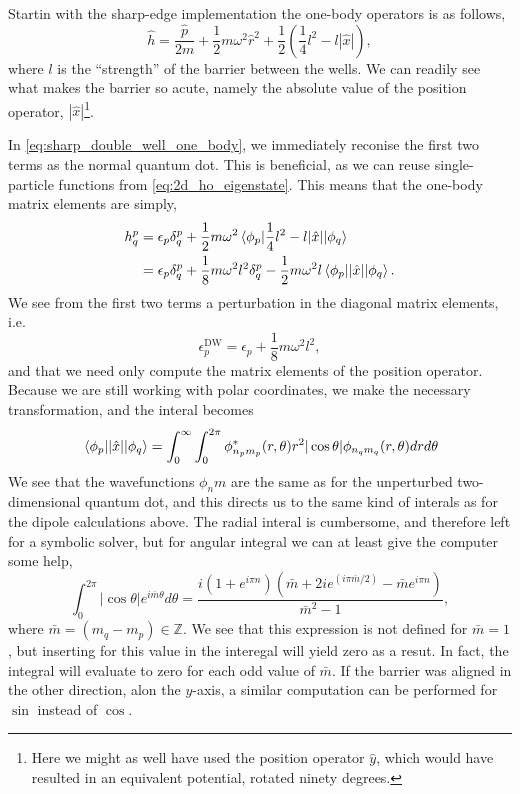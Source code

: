 Startin with the sharp-edge implementation the one-body operators is 
as follows,
\begin{equation}
    \label{eq:sharp_double_well_one_body}
    \hat{h} = \frac{\hat{p}}{2m} + \frac{1}{2}m \omega^2 \hat{r}^2
        + \frac{1}{2}\left(\frac{1}{4}l^2 - l |\hat{x}| \right),
\end{equation}
where $l$ is the ``strength'' of the barrier between the wells. We 
can readily see what makes the barrier so acute, namely the absolute 
value of the position operator, $|\hat{x}|$\footnote{Here we might as 
well have used the position operator $\hat{y}$, which would have resulted 
in an equivalent potential, rotated ninety degrees.}.

In \autoref{eq:sharp_double_well_one_body}, we immediately reconise 
the first two terms as the normal quantum dot. This is beneficial, as we 
can reuse single-particle functions from \autoref{eq:2d_ho_eigenstate}.
This means that the one-body matrix elements are simply,
\begin{equation}
    \begin{aligned}
    h^p_q &= \epsilon_p\delta^p_q + \frac{1}{2}m\omega^2
        \mel{\phi_p}{\frac{1}{4}l^2 - l |\hat{x}|}{\phi_q} \\ 
    &= \epsilon_p\delta^p_q + \frac{1}{8}m \omega^2l^2\delta^p_q 
        - \frac{1}{2} m \omega^2l \mel{\phi_p}{|\hat{x}|}{\phi_q}.
    \end{aligned}
\end{equation}
We see from the first two terms a perturbation in the diagonal matrix 
elements, i.e. 
\begin{equation}
    \epsilon_p^{\text{DW}} = \epsilon_p + \frac{1}{8}m\omega^2l^2,
\end{equation}
and that we need only compute the matrix elements of the position operator.
Because we are still working with polar coordinates, we make the necessary 
transformation, and the interal becomes
\begin{equation}
    \mel{\phi_p}{|\hat{x}|}{\phi_q} 
    = \int_0^\infty \int_0^{2\pi} 
        \phi_{n_pm_p}^*(r,\theta) r^2 |\cos\theta| \phi_{n_qm_q}(r,\theta)
    drd\theta
\end{equation}
We see that the wavefunctions $\phi_nm$ are the same as for the unperturbed 
two-dimensional quantum dot, and this directs us to the same kind of interals 
as for the dipole calculations above. The radial interal is cumbersome, and
therefore left for a symbolic solver, but for angular integral we can at least 
give the computer some help,
\begin{equation}
    \int_0^{2\pi} |\cos\theta| e^{i\bar{m}\theta} d\theta
    = \frac{i(1 + e^{i\pi n})(\bar{m} + 2ie^{(i\pi \bar{m}/2)} - \bar{m}e^{i\pi n})}{\bar{m}^2 - 1},
\end{equation}
where $\bar{m} = (m_q - m_p) \in \mathbb{Z}$. We see that this expression is 
not defined for $\bar{m} = 1$, but inserting for this value in the interegal 
will yield zero as a resut. In fact, the integral will evaluate to zero for 
each odd value of $\bar{m}$. If the barrier was aligned in the other direction,
alon the $y$-axis, a similar computation can be performed for $\sin$ instead of 
$\cos$.

